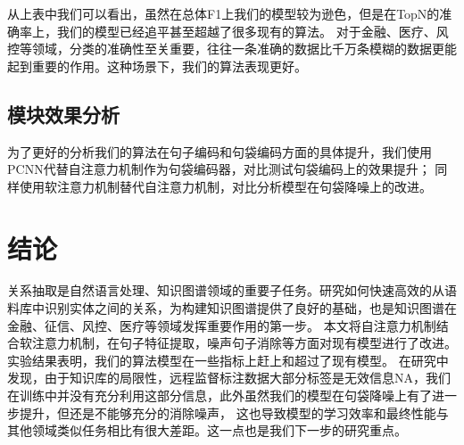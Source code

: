 \documentclass[UTF8]{csoarticle}
\begin{document}
从上表中我们可以看出，虽然在总体F1上我们的模型较为逊色，但是在TopN的准确率上，我们的模型已经追平甚至超越了很多现有的算法。
对于金融、医疗、风控等领域，分类的准确性至关重要，往往一条准确的数据比千万条模糊的数据更能起到重要的作用。这种场景下，我们的算法表现更好。    
\subsection{模块效果分析}
为了更好的分析我们的算法在句子编码和句袋编码方面的具体提升，我们使用PCNN代替自注意力机制作为句袋编码器，对比测试句袋编码上的效果提升；
同样使用软注意力机制替代自注意力机制，对比分析模型在句袋降噪上的改进。
\section{结论}
关系抽取是自然语言处理、知识图谱领域的重要子任务。研究如何快速高效的从语料库中识别实体之间的关系，为构建知识图谱提供了良好的基础，也是知识图谱在金融、征信、风控、医疗等领域发挥重要作用的第一步。
本文将自注意力机制结合软注意力机制，在句子特征提取，噪声句子消除等方面对现有模型进行了改进。实验结果表明，我们的算法模型在一些指标上赶上和超过了现有模型。
在研究中发现，由于知识库的局限性，远程监督标注数据大部分标签是无效信息NA，我们在训练中并没有充分利用这部分信息，此外虽然我们的模型在句袋降噪上有了进一步提升，但还是不能够充分的消除噪声，
这也导致模型的学习效率和最终性能与其他领域类似任务相比有很大差距。这一点也是我们下一步的研究重点。



\end{document}
